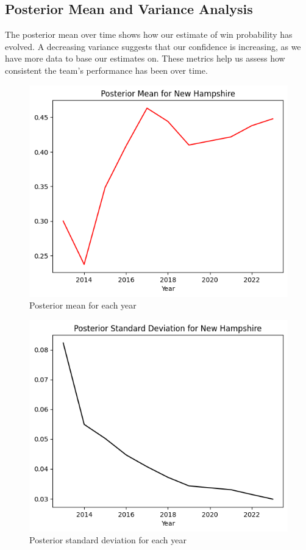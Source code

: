 \subsection{Posterior Mean and Variance Analysis}

The posterior mean over time shows how our estimate of win probability has evolved.
A decreasing variance suggests that our confidence is increasing, as we have more data to base our estimates on.
These metrics help us assess how consistent the team’s performance has been over time.

\begin{figure}[!ht]
  \centering
  \includegraphics[width=.5\textwidth]{images/posterior-mean.png}
  \caption{Posterior mean for each year}
\end{figure}

\begin{figure}[!ht]
  \centering
  \includegraphics[width=.5\textwidth]{images/posterior-sd.png}
  \caption{Posterior standard deviation for each year}
\end{figure}
